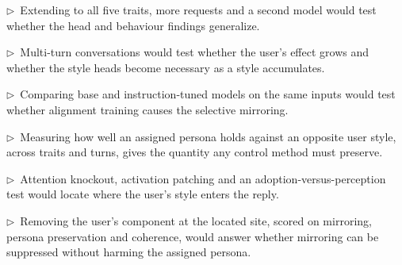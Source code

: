 \documentclass[11pt]{article}
\newcommand{\flow}[1]{\par\noindent\textcolor{blue!60!black}{\small$\triangleright$\ #1}\par\medskip}
\begin{document}
\flow{Extending to all five traits, more requests and a second model would test whether the head and behaviour findings generalize.}

\flow{Multi-turn conversations would test whether the user's effect grows and whether the style heads become necessary as a style accumulates.}

\flow{Comparing base and instruction-tuned models on the same inputs would test whether alignment training causes the selective mirroring.}

\flow{Measuring how well an assigned persona holds against an opposite user style, across traits and turns, gives the quantity any control method must preserve.}

\flow{Attention knockout, activation patching and an adoption-versus-perception test would locate where the user's style enters the reply.}

\flow{Removing the user's component at the located site, scored on mirroring, persona preservation and coherence, would answer whether mirroring can be suppressed without harming the assigned persona.}
\end{document}
